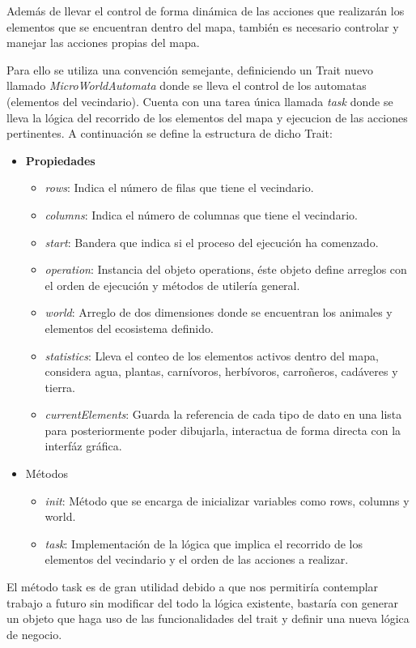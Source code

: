     Además de llevar el control de forma dinámica de las acciones que realizarán los elementos que se encuentran dentro del mapa, también es necesario controlar y manejar las acciones propias del mapa.

    Para ello se utiliza una convención semejante, definiciendo un Trait nuevo llamado \textit{MicroWorldAutomata} donde se lleva el control de los automatas (elementos del vecindario). Cuenta con una tarea única llamada \textit{task} donde se lleva la lógica del recorrido de los elementos del mapa y ejecucion de las acciones pertinentes. A continuación se define la estructura de dicho Trait:

      \begin{itemize}
        \item{\textbf{Propiedades}}
            \begin{itemize}
              \item{\textit{rows}: Indica el número de filas que tiene el vecindario.}
              \item{\textit{columns}: Indica el número de columnas que tiene el vecindario.}
              \item{\textit{start}: Bandera que indica si el proceso del ejecución ha comenzado.}
              \item{\textit{operation}: Instancia del objeto operations, éste objeto define arreglos con el orden de ejecución y métodos de utilería general.}
              \item{\textit{world}: Arreglo de dos dimensiones donde se encuentran los animales y elementos del ecosistema definido.}
              \item{\textit{statistics}: Lleva el conteo de los elementos activos dentro del mapa, considera agua, plantas, carnívoros, herbívoros, carroñeros, cadáveres y tierra.}
              \item{\textit{currentElements}: Guarda la referencia de cada tipo de dato en una lista para posteriormente poder dibujarla, interactua de forma directa con la interfáz gráfica.}
            \end{itemize}
          \item{Métodos}
            \begin{itemize}            
              \item{\textit{init}: Método que se encarga de inicializar variables como rows, columns y world.}
              \item{\textit{task}: Implementación de la lógica que implica el recorrido de los elementos del vecindario y el orden de las acciones a realizar.}            
            \end{itemize}        
      \end{itemize}
    El método task es de gran utilidad debido a que nos permitiría contemplar trabajo a futuro sin modificar del todo la lógica existente, bastaría con generar un objeto que haga uso de las funcionalidades del trait y definir una nueva lógica de negocio.
